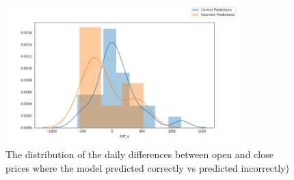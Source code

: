 \begin{figure}[H]
	\centering
	\includegraphics[width=0.8\textwidth]{images/dist_of_model.png}
	\caption{The distribution of the daily differences between open and close prices where the model predicted correctly vs predicted incorrectly)}
	\label{fig:distmodel}
\end{figure}





